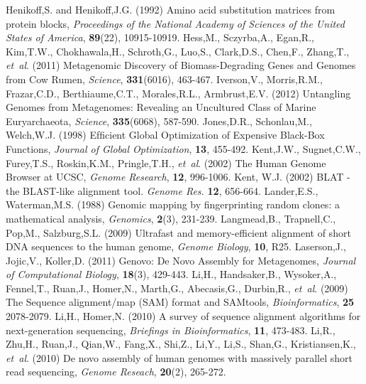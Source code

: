 \begin{thebibliography}{}
    Henikoff,S. and Henikoff,J.G. (1992) Amino acid substitution matrices from protein blocks, {\it Proceedings of the National Academy of Sciences of the United States of America}, {\bf 89}(22), 10915-10919.
 Hess,M., Sczyrba,A., Egan,R., Kim,T.W., Chokhawala,H., Schroth,G., Luo,S., Clark,D.S., Chen,F., Zhang,T., {\it et~al}. (2011) Metagenomic Discovery of Biomass-Degrading Genes and Genomes from Cow Rumen, {\it Science}, {\bf 331}(6016), 463-467.
 Iverson,V., Morris,R.M., Frazar,C.D., Berthiaume,C.T., Morales,R.L., Armbrust,E.V. (2012) Untangling Genomes from Metagenomes: Revealing an Uncultured Class of Marine Euryarchaeota, {\it Science}, {\bf 335}(6068), 587-590.
 Jones,D.R., Schonlau,M., Welch,W.J. (1998) Efﬁcient Global Optimization of Expensive Black-Box Functions, {\it Journal of Global Optimization}, {\bf 13}, 455-492.
 Kent,J.W., Sugnet,C.W., Furey,T.S., Roskin,K.M., Pringle,T.H., {\it et~al}. (2002) The Human Genome Browser at UCSC, {\it Genome Research}, {\bf 12}, 996-1006.
 Kent, W.J. (2002) BLAT - the BLAST-like alignment tool. \textit{Genome Res.} \textbf{12}, 656-664.
 Lander,E.S., Waterman,M.S. (1988) Genomic mapping by fingerprinting random clones: a mathematical analysis, {\it Genomics}, {\bf 2}(3), 231-239.
 Langmead,B., Trapnell,C., Pop,M., Salzburg,S.L. (2009) Ultrafast and memory-efficient alignment of short DNA sequences to the human genome, {\it Genome Biology}, {\bf 10}, R25.
 Laserson,J., Jojic,V., Koller,D. (2011) Genovo: De Novo Assembly for Metagenomes, {\it Journal of Computational Biology}, {\bf 18}(3), 429-443.
 Li,H., Handsaker,B., Wysoker,A., Fennel,T., Ruan,J., Homer,N., Marth,G., Abecasis,G., Durbin,R., {\it et~al}. (2009) The Sequence alignment/map (SAM) format and SAMtools, {\it Bioinformatics}, {\bf 25} 2078-2079.
 Li,H., Homer,N. (2010) A survey of sequence alignment algorithms for next-generation sequencing, {\it Briefings in Bioinformatics}, {\bf 11}, 473-483.
 Li,R., Zhu,H., Ruan,J., Qian,W., Fang,X., Shi,Z., Li,Y., Li,S., Shan,G., Kristiansen,K., {\it et~al}. (2010) De novo assembly of human genomes with massively parallel short read sequencing, {\it Genome Reseach}, {\bf 20}(2), 265-272.

\end{thebibliography}
